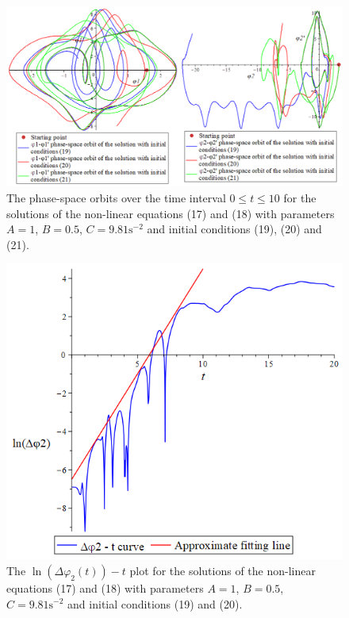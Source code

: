 \documentclass[11pt]{article}
\begin{document}
\begin{figure}[H]
    \centering
    \includegraphics[scale=0.4]{Figure9.PNG}
    \caption{The phase-space orbits over the time interval \(0\le t\le 10\) for the solutions of the non-linear equations (17) and (18) with parameters \(A = 1\), \(B= 0.5\), \(C = 9.81 \mathrm{s}^{-2}\) and initial conditions (19), (20) and (21).}
    \label{Figure 9}
\end{figure}
\begin{figure}[H]
    \centering
    \includegraphics[scale=0.45]{Figure10.PNG}
    \caption{The \(\ln(\Delta\varphi_2(t))- t \) plot for the solutions of the non-linear equations (17) and (18) with parameters \(A = 1\), \(B= 0.5\), \(C = 9.81 \mathrm{s}^{-2}\) and initial conditions (19) and (20).}
    \label{Figure 10}
\end{figure}
\end{document}

